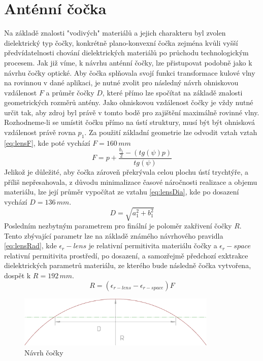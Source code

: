 \section{Anténní čočka}
Na základě znalosti "vodivých" materiálů a jejich charakteru byl zvolen dielektrický typ čočky, konkrétně plano-konvexní čočka zejména kvůli vyšší předvídatelnosti chování dielektrických materiálů po průchodu technologickým procesem.
Jak již víme, k návrhu anténní čočky, lze přistupovat podobně jako k návrhu čočky optické.
Aby čočka splňovala svojí funkci transformace kulové vlny na rovinnou v dané aplikaci, je nutné zvolit pro následný návrh ohniskovou vzdálenost $F$ a průměr čočky $D$, které přímo lze spočítat na základě znalosti geometrických rozměrů antény.
Jako ohniskovou vzdálenost čočky je vždy nutné určit tak, aby zdroj byl právě v tomto bodě pro zajištění maximálně rovinné vlny. Rozhodneme-li se umístit čočku přímo na ústí struktury, musí být být ohnisková vzdálenost právě rovna $p_1$. Za použití základní geometrie lze odvodit vztah vztah \ref{eq:lensF}, kde poté vychází $F = 160\,mm$
\begin{equation}
F = p + \frac{\frac{b_1}{2}-(tg(\psi) p) }{tg(\psi)}
\label{eq:lensF}
\end{equation}
Jelikož je důležité, aby čočka zároveň překrývala celou plochu ústí trychtýře, a příliš nepřesahovala, z důvodu minimalizace časové náročnosti realizace a objemu materiálu, lze její průměr vypočítat ze vztahu \ref{eq:lensDia}, kde po dosazení vychází $D = 136\,mm$.
\begin{equation}
D = \sqrt{a_1^2+b_1^2} 
\label{eq:lensDia}
\end{equation}
Posledním nezbytným parametrem pro finální je poloměr zakřivení čočky $R$. Tento zbývající parametr lze na základě známého návrhového pravidla \ref{eq:lensRad}, kde $\epsilon_r-lens$ je relativní permitivita materiálu čočky a $\epsilon_r-space$ relativní permitivita prostředí, po dosazení, a samozřejmě předchozí exktrakce dielektrických parametrů materiálu, ze kterého bude následně čočka vytvořena, dospět k $R = 192\,mm$.
\begin{equation}
R = (\epsilon_{r-lens} - \epsilon_{r-space})F
\label{eq:lensRad}
\end{equation}

\begin{figure}[h]
\begin{center}
\includegraphics[width=9.5cm]{pics/LensDesign}
\caption{Návrh čočky}
\label{fig:LensDesign}
\end{center}
\end{figure}

